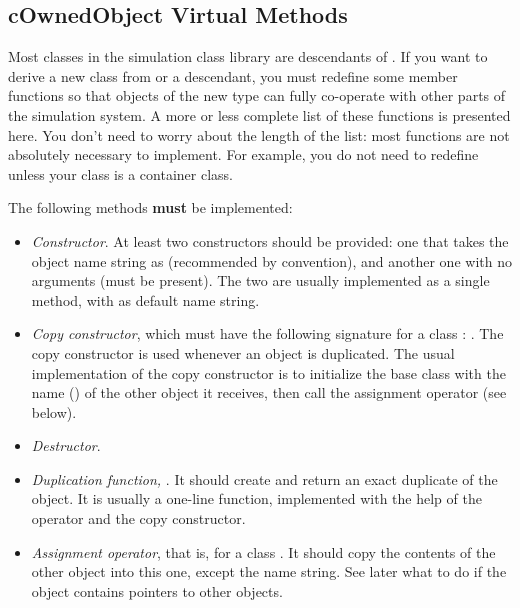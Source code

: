 \subsection{cOwnedObject Virtual Methods}

Most classes in the simulation class library are descendants of
. If you want to derive a new class from
 or a  descendant, you must redefine
some member functions so that objects of the new type can fully
co-operate with other parts of the simulation system. A more or less
complete list of these functions is presented here. You don't need to
worry about the length of the list: most functions are not
absolutely necessary to implement. For example, you do not need to
redefine  unless your class is a container class.

The following methods \textbf{must} be implemented:

\begin{itemize}
  \item{\textit{Constructor}. At least two constructors should be provided:
        one that takes the object name string as 
        (recommended by convention), and another one with no arguments
        (must be present). The two are usually implemented as a single
        method, with  as default name string.}
  \item{\textit{Copy constructor}, which must have the following signature
        for a class : . The copy constructor is used
        whenever an object is duplicated. The usual implementation of
        the copy constructor is to initialize the base class with the
        name () of the other object it receives, then call the
        assignment operator (see below).}
  \item{\textit{Destructor}.}
  \item{\textit{Duplication function,} .
        It should create and return an exact duplicate of the object.
        It is usually a one-line function, implemented with the help
        of the  operator and the copy constructor.}
  \item{\textit{Assignment operator}, that is, 
        for a class . It should copy the contents of the other
        object into this one, except the name string. See later what to do
        if the object contains pointers to other objects.}
\end{itemize}

